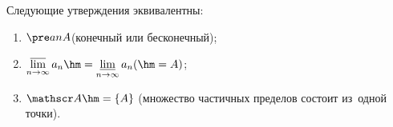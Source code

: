
Следующие утверждения эквивалентны:

\begin{enumerate}
    \item   $\pre anA$(конечный или бесконечный);

    \item   $\varlimsup\limits_{n\to\infty}a_n\hm=
        \varliminf\limits_{n\to\infty}a_n(\hm=A)$;

    \item $\mathscr A\hm=\{A\}$ (множество частичных пределов состоит из~одной точки).
\end{enumerate}
